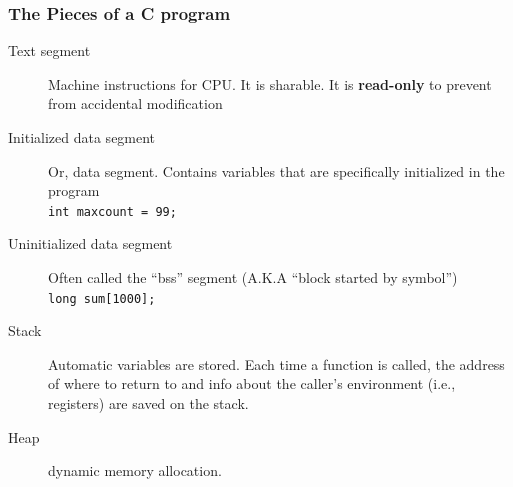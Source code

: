 \documentclass[newPxFont,sthlmFooter,nooffset]{beamer}
\begin{document}
\begin{frame}[t]
  \frametitle{The Pieces of a C program}
  \begin{description}
  \item[Text segment] Machine instructions for CPU. It is sharable. It is \textbf{read-only} to prevent from accidental modification
  \item[Initialized data segment] Or, data segment. Contains variables that are specifically initialized in the program \\
\texttt{int maxcount = 99;}
\item[Uninitialized data segment] Often called the ``bss'' segment (A.K.A ``block started by symbol'') \\
\texttt{long sum[1000];}
\item[Stack] Automatic variables are stored. Each time a function is called, the address of where to return to and info about the caller's environment (i.e., registers) are saved on the stack.
\item[Heap] dynamic memory allocation. 
  \end{description}


\end{frame}
\end{document}
